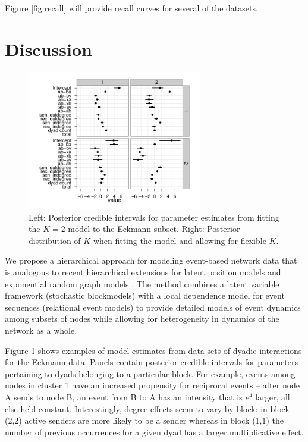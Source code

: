 \documentclass{article}
\begin{document}
Figure \ref{fig:recall} will provide recall curves for several of the datasets.

\section{Discussion}


\begin{figure}[t]
\includegraphics[width=3in]{../figs/eckmann-small/params-estimates}
\fbox{\rule[.5cm]{0cm}{5cm} \rule[.5cm]{5cm}{0cm}}
\caption{Left: Posterior credible intervals for parameter estimates from fitting the $K=2$ model to the Eckmann subset.  Right: Posterior distribution of $K$ when fitting the model and allowing for flexible $K$.}
\label{fig:posteriorparams}
\end{figure}

 We propose a hierarchical approach for modeling event-based network data that is analogous to recent hierarchical extensions for latent position models \cite{Handcock2007} and exponential random graph models \cite{Schweinberger2011}.  The method combines a latent variable framework (stochastic blockmodels) with a local dependence model for event sequences (relational event models) to provide detailed models of event dynamics among subsets of nodes while allowing for heterogeneity in dynamics of the network as a whole.

Figure \ref{fig:posteriorparams} shows examples of model estimates from data sets of dyadic interactions for the Eckmann data. Panels contain posterior credible intervals for parameters pertaining to dyads belonging to a particular block.  For example, events among nodes in cluster 1 have an increased propensity for reciprocal events -- after node A sends to node B, an event from B to A has an intensity that is $e^4$ larger, all else held constant.  Interestingly, degree effects seem to vary by block: in block (2,2) active senders are more likely to be a sender whereas in block (1,1) the number of previous occurrences for a given dyad has a larger multiplicative effect.  
\end{document}
